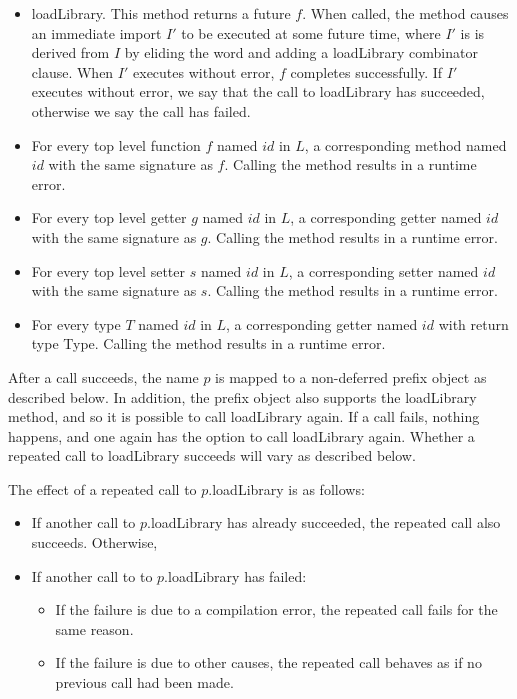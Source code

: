 \documentclass{article}
\newcommand{\code}[1]{{\sf #1}}
\begin{document}
\begin{itemize}
\item \code{loadLibrary}. This method returns a future $f$. When called, the method causes an immediate import $I'$ to be executed at some future time, where $I'$ is is derived from $I$ by eliding the word \DEFERRED{} and adding a \HIDE{} \code{loadLibrary}  combinator clause. When $I'$ executes without error, $f$ completes successfully. If $I'$ executes without error, we say that the call to \code{loadLibrary} has succeeded, otherwise we say the call has failed.
\item  For every top level function $f$ named $id$ in $L$, a corresponding method named $id$ with the same signature as $f$. Calling the method results in a runtime error.
\item For every top level getter $g$ named $id$ in $L$, a corresponding getter named $id$ with the same signature as $g$.  Calling the method results in a runtime error.
\item For every top level setter $s$ named $id$ in $L$, a corresponding setter named $id$ with the same signature as $s$.  Calling the method results in a runtime error.
\item For every type $T$ named $id$ in $L$, a corresponding getter named $id$ with return type \code{Type}.  Calling the method results in a runtime error.
\end{itemize}

\LMHash{}
After a call succeeds, the name $p$ is mapped to a non-deferred prefix object as described below. In addition, the prefix object also supports the \code{loadLibrary} method, and so it is possible to call \code{loadLibrary} again. If a call fails, nothing happens, and one again has the option to call \code{loadLibrary} again. Whether a repeated call to \code{loadLibrary} succeeds will vary as described below.

\LMHash{}
The effect of a repeated call to \code{$p$.loadLibrary} is as follows:
\begin{itemize}
\item
If another call to \code{$p$.loadLibrary} has already succeeded, the repeated call also succeeds. 
Otherwise,
\item
If another call to  to \code{$p$.loadLibrary} has failed:
\begin{itemize}
\item
If the failure is due to a compilation error, the repeated call fails for the same reason.
\item
If the failure is due to other causes, the repeated call behaves as if no previous call had been made.
\end{itemize}
\end{itemize}
\end{document}
